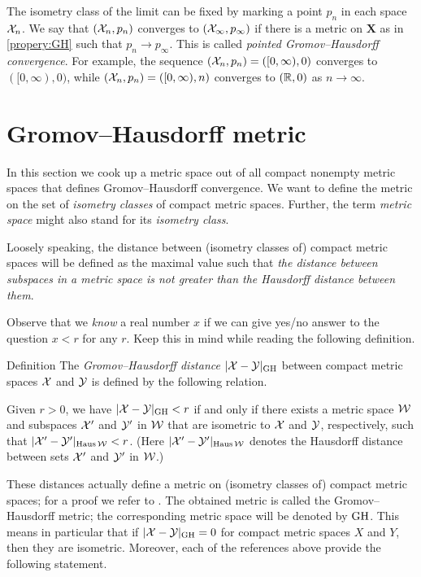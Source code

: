 The isometry class of the limit can be fixed by marking a point $p_n$ in each space $\mathcal{X}_n$.
We say that $(\mathcal{X}_n,p_n)$ converges to $(\mathcal{X}_\infty,p_\infty)$ if there is a metric on $\bm{X}$ as in \ref{propery:GH} such that $p_n\to p_\infty$.
This is called \emph{pointed Gromov--Hausdorff convergence}.
For example, the sequence $(\mathcal{X}_n,p_n)=([0,\infty),0)$ converges to $([0,\infty),0)$, while $(\mathcal{X}_n,p_n)=([0,\infty),n)$ converges to $(\mathbb{R},0)$ as $n\to \infty$.

\section{Gromov--Hausdorff metric}\label{sec:Gromov--Hausdorff-metric}

In this section we cook up a metric space out of all compact nonempty metric spaces
that defines Gromov--Hausdorff convergence.
We want to define the metric on the set of \textit{isometry classes} of compact metric spaces.
Further, the term \textit{metric space} might also stand for its \textit{isometry class}.

Loosely speaking, the distance between (isometry classes of) compact metric spaces will be defined as the maximal value such that \textit{the distance between subspaces in a metric space is not greater than the Hausdorff distance between them}.

Observe that we \textit{know} a real number $x$ if we can give yes/no answer to the question $x<r$ for any $r$.
Keep this in mind while reading the following definition.

\begin{thm}{Definition}\label{def:GH}
The \emph{Gromov--Hausdorff distance} $|\mathcal{X}-\mathcal{Y}|_{\operatorname{\rm GH}\nolimits}$ between compact metric spaces $\mathcal{X}$ and $\mathcal{Y}$
is defined by the following
relation.

Given  $r > 0$, we have $|\mathcal{X}-\mathcal{Y}|_{\operatorname{\rm GH}\nolimits} < r$ if and only if there exists a metric
space $\mathcal{W}$ and subspaces $\mathcal{X}'$ and $\mathcal{Y}'$ in $\mathcal{W}$ that are isometric to $\mathcal{X}$ and $\mathcal{Y}$,
respectively, such that $|\mathcal{X}'-\mathcal{Y}'|_{\operatorname{\rm Haus}\nolimits\mathcal{W}} < r$.
(Here $|\mathcal{X}'-\mathcal{Y}'|_{\operatorname{\rm Haus}\nolimits\mathcal{W}}$ denotes the Hausdorff distance between sets $\mathcal{X}'$ and $\mathcal{Y}'$ in $\mathcal{W}$.)
\end{thm}

These distances actually define a metric on (isometry classes of) compact metric spaces; for a proof we refer to \cite{burago-burago-ivanov,petrunin2023pure}.
The obtained metric is called the Gromov--Hausdorff metric;
the corresponding metric space will be denoted by $\operatorname{\rm GH}\nolimits$.
This means in particular that if $|\mathcal{X}-\mathcal{Y}|_{\operatorname{\rm GH}\nolimits}=0$ for compact metric spaces $X$ and $Y$, then they are isometric.
Moreover, each of the references above provide the following statement.

